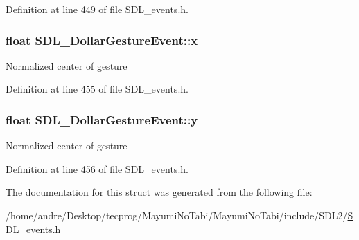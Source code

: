 Definition at line 449 of file S\-D\-L\-\_\-events.\-h.

\hypertarget{struct_s_d_l___dollar_gesture_event_a9888449bd8842ed96494b4db16a6097b}{
\subsubsection[{x}]{\setlength{\rightskip}{0pt plus 5cm}float S\-D\-L\-\_\-\-Dollar\-Gesture\-Event\-::x}}\label{struct_s_d_l___dollar_gesture_event_a9888449bd8842ed96494b4db16a6097b}
Normalized center of gesture 

Definition at line 455 of file S\-D\-L\-\_\-events.\-h.

\hypertarget{struct_s_d_l___dollar_gesture_event_a293b2303acc1cfc63c167c5525e6eab5}{
\subsubsection[{y}]{\setlength{\rightskip}{0pt plus 5cm}float S\-D\-L\-\_\-\-Dollar\-Gesture\-Event\-::y}}\label{struct_s_d_l___dollar_gesture_event_a293b2303acc1cfc63c167c5525e6eab5}
Normalized center of gesture 

Definition at line 456 of file S\-D\-L\-\_\-events.\-h.



The documentation for this struct was generated from the following file\-:\begin{DoxyCompactItemize}
\item 
/home/andre/\-Desktop/tecprog/\-Mayumi\-No\-Tabi/\-Mayumi\-No\-Tabi/include/\-S\-D\-L2/\hyperlink{_s_d_l__events_8h}{S\-D\-L\-\_\-events.\-h}\end{DoxyCompactItemize}
